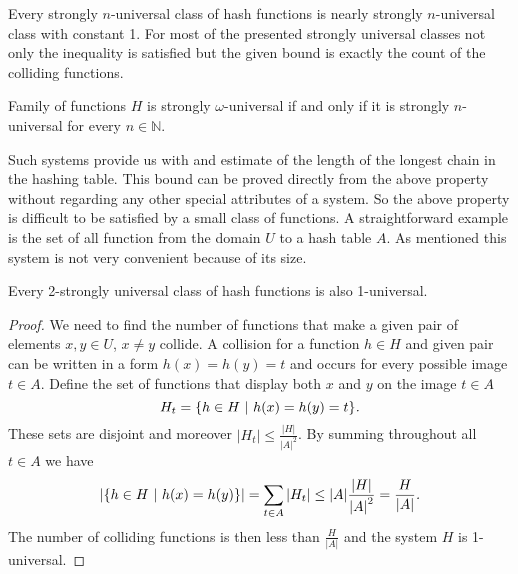 Every strongly $n$-universal class of hash functions is nearly strongly $n$-universal class with constant 1. For most of the presented strongly universal classes not only the inequality is satisfied but the given bound is exactly the count of the colliding functions.

\begin{definition}
\label{strong_universal_omega_system}
Family of functions $H$ is strongly $\omega$-universal if and only if it is strongly $n$-universal for every $n \in \mathbb{N}$.
\end{definition}

Such systems provide us with and estimate of the length of the longest chain in the hashing table. This bound can be proved directly from the above property without regarding any other special attributes of a system. So the above property is difficult to be satisfied by a small class of functions. A straightforward example is the set of all function from the domain $U$ to a hash table $A$. As mentioned this system is not very convenient because of its size.

\begin{remark}
Every 2-strongly universal class of hash functions is also 1-universal.
\end{remark}
\begin{proof}
We need to find the number of functions that make a given pair of elements $x, y \in U$, $x \neq y$ collide. A collision for a function $h \in H$ and given pair can be written in a form $h(x) = h(y) = t$ and occurs for every possible image $t \in A$. Define the set of functions that display both $x$ and $y$ on the image $t \in A$ \[ H_t = \lbrace h \in H \ | \  h(x) = h(y) = t \rbrace \textit{.} \] These sets are disjoint and moreover $|H_t| \leq \frac{|H|}{{|A|}^{2}}$. By summing throughout all $t \in A$ we have
\begin{displaymath}
|\lbrace h \in H \ | \  h(x) = h(y) \rbrace | = \displaystyle \sum_{t \in A} |H_t| \leq |A| \frac{|H|}{{|A|}^{2}} = \frac{H}{|A|}\textit{.}
\end{displaymath}
The number of colliding functions is then less than $\frac{H}{|A|}$ and the system $H$ is 1-universal.
\end{proof}

